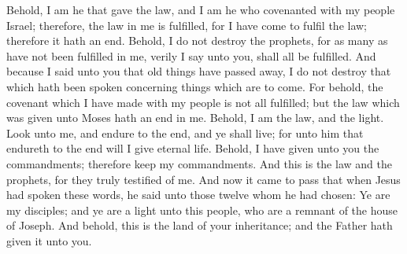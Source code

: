 Behold, I am he that gave the law, and I am he who covenanted with my people Israel; therefore, the law in me is fulfilled, for I have come to fulfil the law; therefore it hath an end.
\bverse \iffalse Behold, I do not destroy the prophets, for as many as have not been fulfilled in me, verily I say unto you, shall all be fulfilled. \fi
Behold, I do not destroy the prophets, for as many as have not been fulfilled in me, verily I say unto you, shall all be fulfilled.
\bverse \iffalse And because I said unto you that old things have passed away, I do not destroy that which hath been spoken concerning things which are to come. \fi
And because I said unto you that old things have passed away, I do not destroy that which hath been spoken concerning things which are to come.
\bverse \iffalse For behold, the covenant which I have made with my people is not all fulfilled; but the law which was given unto Moses hath an end in me. \fi
For behold, the covenant which I have made with my people is not all fulfilled; but the law which was given unto Moses hath an end in me.
\bverse \iffalse Behold, I am the law, and the light. Look unto me, and endure to the end, and ye shall live; for unto him that endureth to the end will I give eternal life. \fi
Behold, I am the law, and the light. Look unto me, and endure to the end, and ye shall live; for unto him that endureth to the end will I give eternal life.
\bverse \iffalse Behold, I have given unto you the commandments; therefore keep my commandments. And this is the law and the prophets, for they truly testified of me. \fi
Behold, I have given unto you the commandments; therefore keep my commandments. And this is the law and the prophets, for they truly testified of me.
\bverse \iffalse And now it came to pass that when Jesus had spoken these words, he said unto those twelve whom he had chosen: \fi
And now it came to pass that when Jesus had spoken these words, he said unto those twelve whom he had chosen:
\bverse \iffalse Ye are my disciples; and ye are a light unto this people, who are a remnant of the house of Joseph. \fi
Ye are my disciples; and ye are a light unto this people, who are a remnant of the house of Joseph.
\bverse \iffalse And behold, this is the land of your inheritance; and the Father hath given it unto you. \fi
And behold, this is the land of your inheritance; and the Father hath given it unto you.
\bverse \iffalse And not at any time hath the Father given me commandment that I should tell it unto your brethren at Jerusalem. \fi
